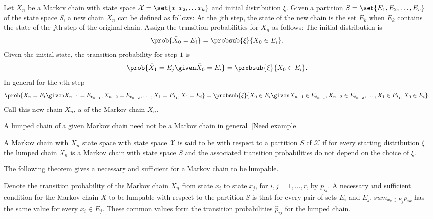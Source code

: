 \documentclass[12pt]{article}
\begin{document}
\begin{definition}
    Let \( X_n \) be a Markov chain with state space \( \mathcal{X} =
    \set{x_1 x_2, \dots x_k} \) and initial distribution \( \xi \).
    Given a partition \( \bar{S} = \set{E_1, E_2, \dots, E_v} \) of the
    state space \( S \), a new chain \( \bar{X}_n \) can be defined as
    follows:  At the \( j \)th step, the state of the new chain is the
    set \( E_k \) when \( E_k \) contains the state of the \( j \)th
    step of the original chain.  Assign the transition probabilities for
    \( \bar{X}_n \) as follows: The initial distribution is
    \[
        \prob{\bar{X}_0 = E_i} = \probsub{\xi}{X_0 \in E_i}.
    \] Given the initial state, the transition probability for step \( 1
    \) is
    \[
        \prob{\bar{X}_1 = E_j \given \bar{X}_0 = E_i} = \probsub{\xi}{X_0
        \in E_i }.
    \] In general for the \( n \)th step
    \[
        \prob{\bar{X}_n = E_t \given \bar{X}_{n-1} = E_{t_{n-1}}, \bar{X}_
        {n-2} = E_{t_{n-2}}, \dots, \bar{X}_1 = E_{t_1}, \bar{X}_0 = E_i}
        = \probsub{\xi}{X_0 \in E_i \given X_{n-1} \in E_{t_{n-1}}, X_{n-2}
        \in E_{t_{n-2}}, \dots, X_1 \in E_{t_1}, X_0 \in E_i}.
    \] Call this new chain \( \bar{X}_n \), a %
    of the Markov chain \( X_n \).
\end{definition}

A lumped chain of a given Markov chain need not be a Markov chain in
general.  [Need example]

\begin{definition}
    A Markov chain with \( X_n \) state space with state space \(
    \mathcal{X} \) is said to be %
    with respect to a partition \( S \) of \( \mathcal{X} \) if for
    every starting distribution \( \xi \) the lumped chain \( \bar{X}_n \)
    is a Markov chain with state space \( S \) and the associated
    transition probabilities do not depend on the choice of \( \xi \).
\end{definition}

The following theorem gives a necessary and sufficient for a Markov
chain to be lumpable.

\begin{theorem}
    Denote the transition probability of the Markov chain \( X_n \) from
    state \( x_i \) to state \( x_j \), for \( i, j = 1, \dots, r \), by
    \( p_{ij} \).  A necessary and sufficient condition for the Markov
    chain \( X \) to be lumpable with respect to the partition \( S \)
    is that for every pair of sets \( E_i \) and \( E_j \), \( sum_{x_k
    \in E_j} p_{ik} \) has the same value for every \( x_i \in E_j \).
    These common values form the transition probabilities \( \hat{p}_{ij}
    \) for the lumped chain.
\end{theorem}
\end{document}
